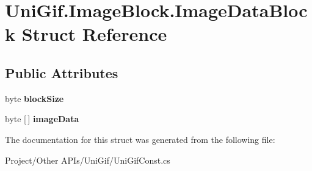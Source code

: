 \hypertarget{struct_uni_gif_1_1_image_block_1_1_image_data_block}{}\section{Uni\+Gif.\+Image\+Block.\+Image\+Data\+Block Struct Reference}
\label{struct_uni_gif_1_1_image_block_1_1_image_data_block}
\subsection*{Public Attributes}
\begin{DoxyCompactItemize}
\item 
\mbox{\label{struct_uni_gif_1_1_image_block_1_1_image_data_block_a873f916735f93e4e817c31d97a7f5580}} 
byte {\bfseries block\+Size}
\item 
\mbox{\label{struct_uni_gif_1_1_image_block_1_1_image_data_block_a2a5c00f84fea5acf92b2bf324dcb440e}} 
byte \mbox{[}$\,$\mbox{]} {\bfseries image\+Data}
\end{DoxyCompactItemize}


The documentation for this struct was generated from the following file\+:\begin{DoxyCompactItemize}
\item 
Project/\+Other A\+P\+Is/\+Uni\+Gif/Uni\+Gif\+Const.\+cs\end{DoxyCompactItemize}
